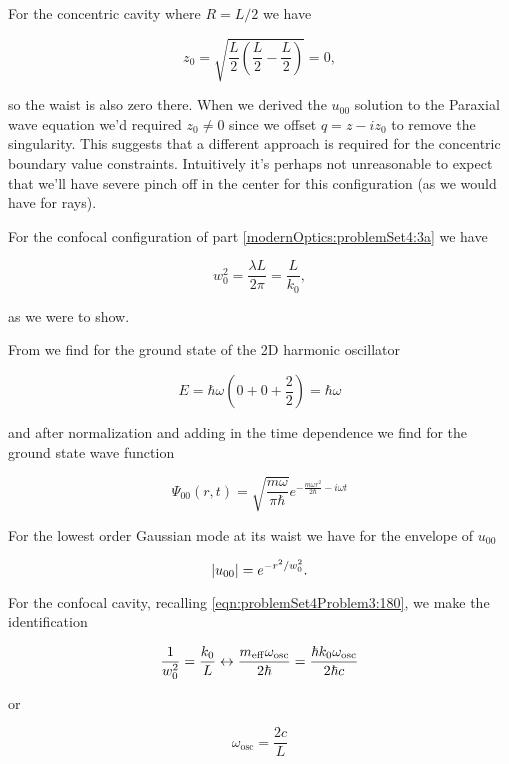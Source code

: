 {For the concentric cavity where $R = L/2$ we have

\begin{equation}\label{eqn:problemSet4Problem3:160}
z_0 = \sqrt{\frac{L}{2} \left( \frac{L}{2} - \frac{L}{2}\right)} = 0,
\end{equation}

so the waist is also zero there.  When we derived the $u_{00}$ solution to the Paraxial wave equation we'd required $z_0 \ne 0$ since we offset $q = z - i z_0$ to remove the singularity.  This suggests that a different approach is required for the concentric boundary value constraints.  Intuitively it's perhaps not unreasonable to expect that we'll have severe pinch off in the center for this configuration (as we would have for rays).

For the confocal configuration of part \ref{modernOptics:problemSet4:3a} we have

\begin{equation}\label{eqn:problemSet4Problem3:180}
w_0^2 = \frac{\lambda L}{2 \pi} = \frac{L}{k_0},
\end{equation}

as we were to show.


From \citep{bohm1989qt} we find for the ground state of the 2D harmonic oscillator 

\begin{equation}\label{eqn:problemSet4Problem3:200}
E = \hbar \omega \left( 0 + 0 + \frac{2}{2} \right) = \hbar \omega
\end{equation}

and after normalization and adding in the time dependence we find for the ground state wave function

\begin{equation}\label{eqn:problemSet4Problem3:220}
\Psi_{00}(r, t) = \sqrt{\frac{m \omega}{\pi \hbar}} e^{ -\frac{m \omega r^2}{2 \hbar} - i \omega t}
\end{equation}

For the lowest order Gaussian mode at its waist we have for the envelope of $u_{00}$

\begin{equation}\label{eqn:problemSet4Problem3:240}
{\left\lvert{u_{00}}\right\rvert} = e^{-r^2/w_0^2}.
\end{equation}

For the confocal cavity, recalling \ref{eqn:problemSet4Problem3:180}, we make the identification

\begin{dmath}\label{eqn:problemSet4Problem3:260}
\inv{w_0^2} 
=
\frac{k_0}{L}
\leftrightarrow \frac{m_{\mathrm{eff}} \omega_{\mathrm{osc}}}{2 \hbar}
=
\frac{\hbar k_0 \omega_{\mathrm{osc}}}{2 \hbar c}
\end{dmath}

or

\begin{equation}\label{eqn:problemSet4Problem3:280}
\boxed{
\omega_{\mathrm{osc}} = \frac{2 c}{L}
}
\end{equation}

}

